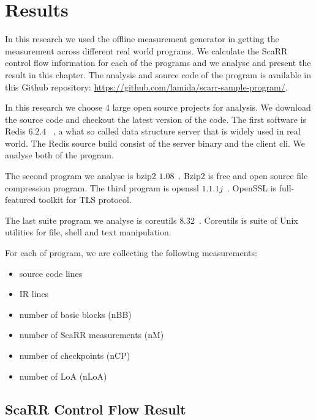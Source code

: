 
\chapter{Results} %

\label{Chapter5} %

In this research we used the offline measurement generator in getting the
measurement across different real world programs. We calculate the ScaRR control
flow information for each of the programs and we analyse and present the result
in this chapter. The analysis and source code of the program is available in
this Github repository: \url{https://github.com/lamida/scarr-sample-program/}.

In this research we choose 4 large open source projects for analysis. We
download the source code and checkout the latest version of the code. The first
software is Redis $6.2.4$ ~\cite{RedisRedis2021}, a what so called data
structure server that is widely used in real world. The Redis source build
consist of the server binary and the client cli. We analyse both of the program.

The second program we analyse is bzip2 $1.08$~\cite{Bzip2Bzip2}. Bzip2 is free
and open source file compression program. The third program is openssl
$1.1.1j$~\cite{OpensslOpenssl2021}. OpenSSL is full-featured toolkit for TLS
protocol. 

The last suite program we analyse is coreutils
$8.32$~\cite{CoreutilsCoreutils2021}. Coreutils is suite of Unix utilities for
file, shell and text manipulation.

For each of program, we are collecting the following measurements:

\begin{itemize}
    \item source code lines
    \item IR lines
    \item number of basic blocks (nBB)
    \item number of ScaRR measurements (nM)
    \item number of checkpoints (nCP)
    \item number of LoA (nLoA)
\end{itemize}

\section{ScaRR Control Flow Result}



